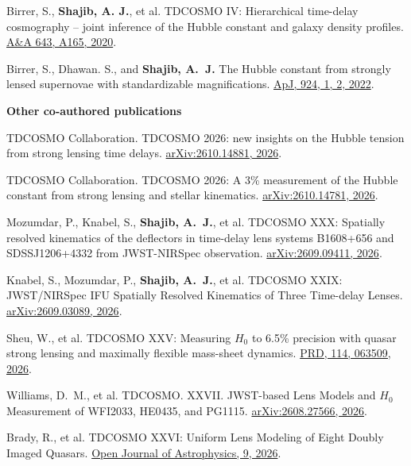 \documentclass[margin, line]{res}
\begin{document}
\begin{resume}
\begin{etaremune}
	\item Birrer, S., \textbf{Shajib, A. J.}, et al. TDCOSMO IV: Hierarchical time-delay cosmography -- joint inference of the Hubble constant and galaxy density profiles. \href{https://doi.org/10.1051/0004-6361/202038861}{A\&A 643, A165, 2020}.
	\item Birrer, S., Dhawan. S., and \textbf{Shajib, A.~J.} The Hubble constant from strongly lensed supernovae with standardizable magnifications. \href{https://iopscience.iop.org/article/10.3847/1538-4357/ac323a}{ApJ, 924, 1, 2, 2022}.
\end{etaremune}

\textbf{Other co-authored publications}
\begin{etaremune}
	\item TDCOSMO Collaboration. TDCOSMO 2026: new insights on the Hubble tension from strong lensing time delays. \href{https://ui.adsabs.harvard.edu/abs/2026arXiv261014881T/abstract}{arXiv:2610.14881, 2026}.
	\item TDCOSMO Collaboration. TDCOSMO 2026: A 3\% measurement of the Hubble constant from strong lensing and stellar kinematics. \href{https://ui.adsabs.harvard.edu/abs/2026arXiv261014781T/abstract}{arXiv:2610.14781, 2026}.
	\item Mozumdar, P., Knabel, S., \textbf{Shajib, A.~J.}, et al. TDCOSMO XXX: Spatially resolved kinematics of the deflectors in time-delay lens systems B1608+656 and SDSSJ1206+4332 from JWST-NIRSpec observation. \href{https://ui.adsabs.harvard.edu/abs/2026arXiv260909411M/abstract}{arXiv:2609.09411, 2026}.
	\item Knabel, S., Mozumdar, P., \textbf{Shajib, A.~J.}, et al. TDCOSMO XXIX: JWST/NIRSpec IFU Spatially Resolved Kinematics of Three Time-delay Lenses. \href{https://ui.adsabs.harvard.edu/abs/2026arXiv260903089K/abstract}{arXiv:2609.03089, 2026}.
	\item Sheu, W., et al. TDCOSMO XXV: Measuring $H_0$ to 6.5\% precision with quasar strong lensing and maximally flexible mass-sheet dynamics. \href{https://ui.adsabs.harvard.edu/abs/2026PhRvD.114f3509S/abstract}{PRD, 114, 063509, 2026}.
	\item Williams, D.~M., et al. TDCOSMO. XXVII. JWST-based Lens Models and $H_0$ Measurement of WFI2033, HE0435, and PG1115. \href{https://ui.adsabs.harvard.edu/abs/2026arXiv260827566W/abstract}{arXiv:2608.27566, 2026}.
	\item Brady, R., et al. TDCOSMO XXVI: Uniform Lens Modeling of Eight Doubly Imaged Quasars. \href{https://ui.adsabs.harvard.edu/abs/2026OJAp....966553B/abstract}{Open Journal of Astrophysics, 9, 2026}.

\end{etaremune}
\end{resume}
\end{document}
